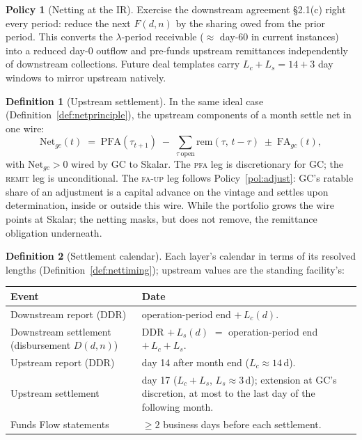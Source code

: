 \documentclass[11pt, a4paper]{article}
\theoremstyle{definition}
\newtheorem{definition}{Definition}[section]
\newtheorem{policy}{Policy}
\newcommand{\src}[1]{}
\newcommand{\GCCIA}{upstream facility}
\newcommand{\KCIA}{downstream agreement}
\newcommand{\PFA}{\mathrm{PFA}}                   %
\newcommand{\rem}{\mathrm{rem}}                   %
\begin{document}
\begin{policy}[Netting at the IR]\label{pol:netir}
Exercise the \KCIA{} \S2.1(c) right every period: reduce the next $F(d, n)$ by the sharing owed from the prior period. This converts the $\lambda$-period receivable ($\approx$ day-60 in current instances) into a reduced day-0 outflow and pre-funds upstream remittances independently of downstream collections. Future deal templates carry $L_c + L_s = 14 + 3$ day windows to mirror upstream natively.
\end{policy}

\begin{definition}[Upstream settlement]\label{def:netup}
In the same ideal case (Definition~\ref{def:netprinciple}), the upstream components of a month settle net in one wire:
\begin{equation}\label{eq:netup}
\mathrm{Net}_{gc}(t) \;=\; \PFA(\tau_{t+1}) \;-\; \sum_{\tau\ \mathrm{open}} \rem(\tau,\, t - \tau) \;\pm\; \mathrm{FA}_{gc}(t),
\end{equation}
with $\mathrm{Net}_{gc} > 0$ wired by GC to Skalar. The \textsc{pfa} leg is discretionary for GC; the \textsc{remit} leg is unconditional. The \textsc{fa-up} leg follows Policy~\ref{pol:adjust}: GC's ratable share of an adjustment is a capital advance on the vintage and settles upon determination, inside or outside this wire. While the portfolio grows the wire points at Skalar; the netting masks, but does not remove, the remittance obligation underneath.
\src{\GCCIA{} \S2.1(e) (``Net Payments''), \S2.1(c).}
\end{definition}

\begin{definition}[Settlement calendar]\label{def:calendar}
Each layer's calendar in terms of its resolved lengths (Definition~\ref{def:nettiming}); upstream values are the standing facility's:
\begin{center}
\begin{tabular}{@{} L{5.2cm} L{8.6cm} @{}}
\toprule
\textbf{Event} & \textbf{Date} \\
\midrule
Downstream report (DDR) & operation-period end $+\,L_c(d)$. \\[3pt]
Downstream settlement (disbursement $D(d,n)$) & DDR $+\,L_s(d)$ $=$ operation-period end $+\,L_c + L_s$. \\[3pt]
Upstream report (DDR) & day 14 after month end ($L_c \approx 14$\,d). \\[3pt]
Upstream settlement & day 17 ($L_c + L_s$, $L_s \approx 3$\,d); extension at GC's discretion, at most to the last day of the following month. \\[3pt]
Funds Flow statements & $\geq 2$ business days before each settlement. \\
\bottomrule
\end{tabular}
\end{center}
\src{\KCIA{} \S2.2(b), ``Disbursement Date''; \GCCIA{} \S2.2(b)--(c), ``Scheduled Disbursement Date''; both \S5.8(g).}
\end{definition}
\end{document}
